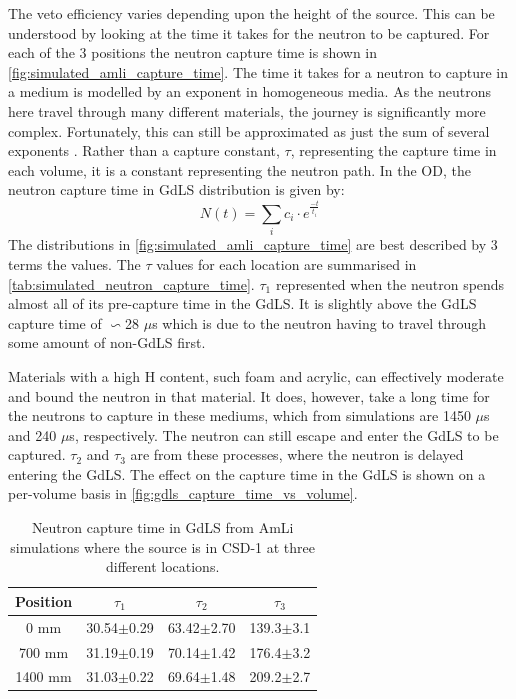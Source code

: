 \par
The veto efficiency varies depending upon the height of the source.
This can be understood by looking at the time it takes for the neutron to be captured.
For each of the 3 positions the neutron capture time is shown in \autoref{fig:simulated_amli_capture_time}.
The time it takes for a neutron to capture in a medium is modelled by an exponent in homogeneous media.
As the neutrons here travel through many different materials, the journey is significantly more complex.
Fortunately, this can still be approximated as just the sum of several exponents \cite{Dayabay_neutron_capture_fit_ref}.
Rather than a capture constant, $\tau$, representing the capture time in each volume, it is a constant representing the neutron path.
In the OD, the neutron capture time in GdLS distribution is given by:
\begin{equation}
    N(t) = \sum_{i} c_i \cdot e^{\frac{-t}{t_i}}
\label{eq:neutron_capture_time}
\end{equation}
The distributions in \autoref{fig:simulated_amli_capture_time} are best described by 3 terms the values.
The $\tau$ values for each location are summarised in \autoref{tab:simulated_neutron_capture_time}.
$\tau_1$ represented when the neutron spends almost all of its pre-capture time in the GdLS.
It is slightly above the GdLS capture time of $\backsim$28 $\mu$s \cite{ucsb_gdls_dicebox_simulations_ref} which is due to the neutron having to travel through some amount of non-GdLS first.
\par
Materials with a high H content, such foam and acrylic, can effectively moderate and bound the neutron in that material.
It does, however, take a long time for the neutrons to capture in these mediums, which from simulations are 1450 $\mu$s and 240 $\mu$s, respectively.
The neutron can still escape and enter the GdLS to be captured.
$\tau_2$ and $\tau_3$ are from these processes, where the neutron is delayed entering the GdLS.
The effect on the capture time in the GdLS is shown on a per-volume basis in \autoref{fig:gdls_capture_time_vs_volume}.

\begin{table}[]
    \centering
    \begin{tabular}{c|c|c|c}
        Position  &  $\tau_1$      & $\tau_2$       & $\tau_3$        \\ \hline
        0 mm      & 30.54$\pm$0.29 & 63.42$\pm$2.70 & 139.3$\pm$3.1   \\ 
        700 mm    & 31.19$\pm$0.19 & 70.14$\pm$1.42 & 176.4$\pm$3.2   \\
        1400 mm   & 31.03$\pm$0.22 & 69.64$\pm$1.48 & 209.2$\pm$2.7         
    \end{tabular}
    \caption{Neutron capture time in GdLS from AmLi simulations where the source is in CSD-1 at three different locations.}
    \label{tab:simulated_neutron_capture_time}
\end{table}

